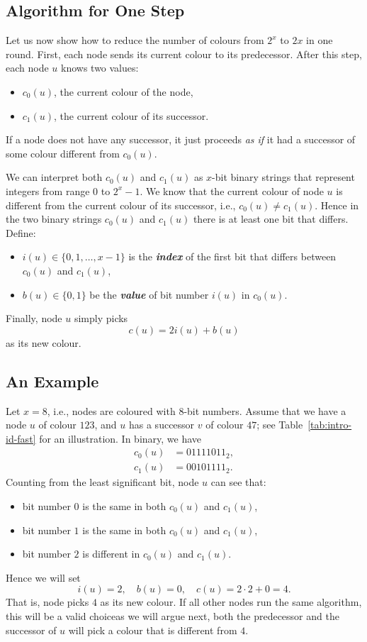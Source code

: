\subsection{Algorithm for One Step}

Let us now show how to reduce the number of colours from $2^x$ to $2x$ in one round. First, each node sends its current colour to its predecessor. After this step, each node $u$ knows two values:
\begin{itemize}[noitemsep]
    \item $c_0(u)$, the current colour of the node,
    \item $c_1(u)$, the current colour of its successor.
\end{itemize}
If a node does not have any successor, it just proceeds \emph{as if} it had a successor of some colour different from $c_0(u)$.

We can interpret both $c_0(u)$ and $c_1(u)$ as $x$-bit binary strings that represent integers from range $0$ to $2^x-1$. We know that the current colour of node $u$ is different from the current colour of its successor, i.e., $c_0(u) \ne c_1(u)$. Hence in the two binary strings $c_0(u)$ and $c_1(u)$ there is at least one bit that differs. Define:
\begin{itemize}
    \item $i(u) \in \{0,1,\dotsc,x-1\}$ is the \emph{\textbf{index}} of the first bit that differs between $c_0(u)$ and $c_1(u)$,
    \item $b(u) \in \{0,1\}$ be the \emph{\textbf{value}} of bit number $i(u)$ in $c_0(u)$.
\end{itemize}
Finally, node $u$ simply picks
\[
    c(u) = 2i(u) + b(u)
\]
as its new colour.


\subsection{An Example}

Let $x = 8$, i.e., nodes are coloured with $8$-bit numbers. Assume that we have a node $u$ of colour $123$, and $u$ has a successor $v$ of colour $47$; see Table~\ref{tab:intro-id-fast} for an illustration. In binary, we have
\begin{align*}
    c_0(u) &= 01111011_2, \\
    c_1(u) &= 00101111_2.
\end{align*}
Counting from the least significant bit, node $u$ can see that:
\begin{itemize}[noitemsep]
    \item bit number $0$ is the same in both $c_0(u)$ and $c_1(u)$,
    \item bit number $1$ is the same in both $c_0(u)$ and $c_1(u)$,
    \item bit number $2$ is different in $c_0(u)$ and $c_1(u)$.
\end{itemize}
Hence we will set
\[
    i(u) = 2, \quad
    b(u) = 0, \quad
    c(u) = 2\cdot2 + 0 = 4.
\]
That is, node picks $4$ as its new colour. If all other nodes run the same algorithm, this will be a valid choice\mydash as we will argue next, both the predecessor and the successor of $u$ will pick a colour that is different from $4$.


